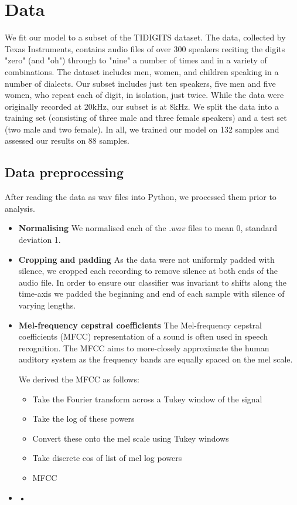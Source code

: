 \documentclass{article} %
\begin{document}
\section{Data}
We fit our model to a subset of the TIDIGITS dataset. The data, collected by Texas Instruments, contains audio files of over 300 speakers reciting the digits "zero" (and "oh") through to "nine" a number of times and in a variety of combinations. The dataset includes men, women, and children speaking in a number of dialects. Our subset includes just ten speakers, five men and five women, who repeat each of digit, in isolation, just twice. While the data were originally recorded at 20kHz, our subset is at 8kHz.
We split the data into a training set (consisting of three male and three female speakers) and a test set (two male and two female). In all, we trained our model on 132 samples and assessed our results on 88 samples.

 

\subsection{Data preprocessing}
After reading the data as wav files into Python, we processed them prior to analysis. 

\begin{itemize}
\item \textbf{Normalising} We normalised each of the $.wav$ files to mean 0, standard deviation 1.

\item \textbf{Cropping and padding} As the data were not uniformly padded with silence, we cropped each recording to remove silence at both ends of the audio file. In order to ensure our classifier was invariant to shifts along the time-axis we padded the beginning and end of each sample with silence of varying lengths. 

\item \textbf{Mel-frequency cepstral coefficients}
The Mel-frequency cepstral coefficients (MFCC) representation of a sound is often used in speech recognition.\cite{abdel2014convolutional} The MFCC aims to more-closely approximate the human auditory system as the frequency bands are equally spaced on the mel scale. 

We derived the MFCC as follows:
\begin{itemize}
\item Take the Fourier transform across a Tukey window of the signal
\item Take the log of these powers
\item Convert these onto the mel scale using Tukey windows
\item Take discrete cos of list of mel log powers
\item MFCC
\end{itemize}
\item \textbf{•}

\end{itemize}
\end{document}
